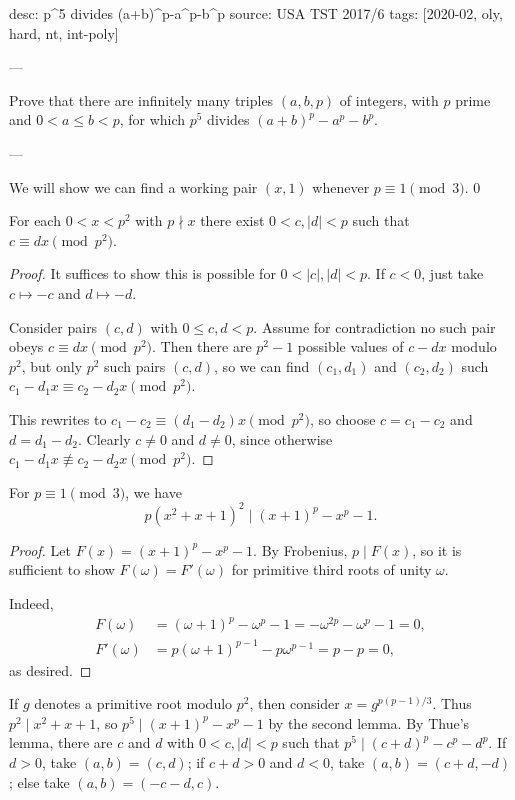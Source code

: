 desc: p^5 divides (a+b)^p-a^p-b^p
source: USA TST 2017/6
tags: [2020-02, oly, hard, nt, int-poly]

---

Prove that there are infinitely many triples $(a,b,p)$ of integers, with $p$ prime and $0<a\le b<p$, for which $p^5$ divides $(a+b)^p-a^p-b^p$.

---

We will show we can find a working pair $(x,1)$ whenever $p\equiv1\pmod3$.
\setcounter{lemma}0
\begin{lemma}
    For each $0<x<p^2$ with $p\nmid x$ there exist $0<c,|d|<p$ such that $c\equiv dx\pmod{p^2}$.
\end{lemma}
\begin{proof}
    It suffices to show this is possible for $0<|c|,|d|<p$. If $c<0$, just take $c\mapsto-c$ and $d\mapsto-d$.

    Consider pairs $(c,d)$ with $0\le c,d<p$. Assume for contradiction no such pair obeys $c\equiv dx\pmod{p^2}$. Then there are $p^2-1$ possible values of $c-dx$ modulo $p^2$, but only $p^2$ such pairs $(c,d)$, so we can find $(c_1,d_1)$ and $(c_2,d_2)$ such $c_1-d_1x\equiv c_2-d_2x\pmod{p^2}$.

    This rewrites to $c_1-c_2\equiv(d_1-d_2)x\pmod{p^2}$, so choose $c=c_1-c_2$ and $d=d_1-d_2$. Clearly $c\ne0$ and $d\ne0$, since otherwise $c_1-d_1x\not\equiv c_2-d_2x\pmod{p^2}$.
\end{proof}
\begin{lemma}
    For $p\equiv1\pmod3$, we have\[p\left(x^2+x+1\right)^2\mid(x+1)^p-x^p-1.\]
\end{lemma}
\begin{proof}
    Let $F(x)=(x+1)^p-x^p-1$. By Frobenius, $p\mid F(x)$, so it is sufficient to show $F(\omega)=F'(\omega)$ for primitive third roots of unity $\omega$.

    Indeed,
    \begin{align*}
        F(\omega)&=(\omega+1)^p-\omega^p-1=-\omega^{2p}-\omega^p-1=0,\\
        F'(\omega)&=p(\omega+1)^{p-1}-p\omega^{p-1}=p-p=0,
    \end{align*}
    as desired.
\end{proof}

If $g$ denotes a primitive root modulo $p^2$, then consider $x=g^{p(p-1)/3}$. Thus $p^2\mid x^2+x+1$, so $p^5\mid(x+1)^p-x^p-1$ by the second lemma. By Thue's lemma, there are $c$ and $d$ with $0<c,|d|<p$ such that $p^5\mid(c+d)^p-c^p-d^p$. If $d>0$, take $(a,b)=(c,d)$; if $c+d>0$ and $d<0$, take $(a,b)=(c+d,-d)$; else take $(a,b)=(-c-d,c)$.
